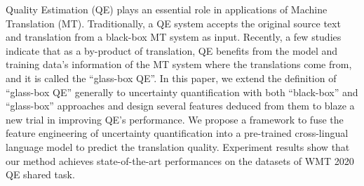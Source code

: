 Quality Estimation (QE) plays an essential role in applications of Machine Translation (MT). Traditionally, a QE system accepts the original source text and translation from a black-box MT system as input. Recently, a few studies indicate that as a by-product of translation, QE benefits from the model and training data's information of the MT system where the translations come from, and it is called the ``glass-box QE''. In this paper, we extend the definition of ``glass-box QE'' generally to uncertainty quantification with both ``black-box'' and ``glass-box'' approaches and design several features deduced from them to blaze a new trial in improving QE's performance. We propose a framework to fuse the feature engineering of uncertainty quantification into a pre-trained cross-lingual language model to predict the translation quality. Experiment results show that our method achieves state-of-the-art performances on the datasets of WMT 2020 QE shared task.
